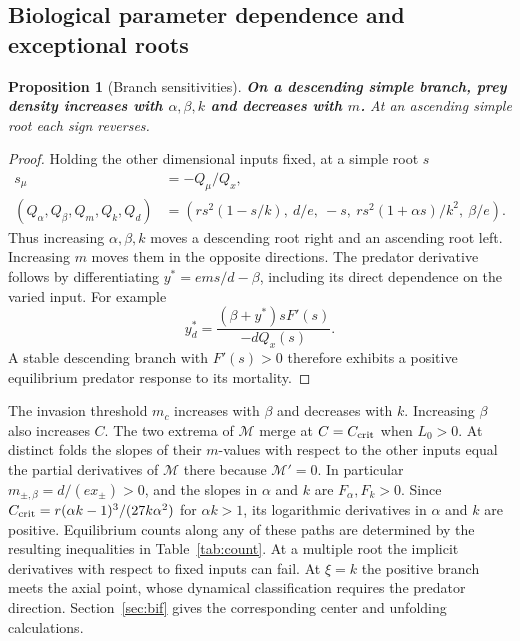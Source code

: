 \documentclass[12pt,a4paper,twoside,fleqn]{article}
\theoremstyle{journal}
\newtheorem{proposition}{Proposition}
\newcommand{\claim}[1]{{\normalfont\bfseries\boldmath #1}}
\begin{document}
\subsection{Biological parameter dependence and exceptional roots}
\begin{proposition}[Branch sensitivities]\label{prop:sens}
\claim{On a descending simple branch, prey density increases with \(\alpha,\beta,k\) and decreases with \(m\).} At an ascending simple root each sign reverses.
\end{proposition}
\begin{proof}
Holding the other dimensional inputs fixed, at a simple root \(s\)
\begin{equation}\label{eq:slopes}
 \begin{aligned}
 s_\mu&=-Q_\mu/Q_x,\\
 (Q_\alpha,Q_\beta,Q_m,Q_k,Q_d)
 &=\left(rs^2(1-s/k),\ d/e,\ -s,\ rs^2(1+\alpha s)/k^2,\ \beta/e\right).
 \end{aligned}
\end{equation}
Thus increasing \(\alpha,\beta,k\) moves a descending root right and an ascending root left. Increasing \(m\) moves them in the opposite directions. The predator derivative follows by differentiating \(y^*=ems/d-\beta\), including its direct dependence on the varied input. For example
\[
 y_d^*=\frac{(\beta+y^*)sF'(s)}{-dQ_x(s)} .
\]
A stable descending branch with \(F'(s)>0\) therefore exhibits a positive equilibrium predator response to its mortality. 

\end{proof}
The invasion threshold \(m_c\) increases with \(\beta\) and decreases with \(k\). Increasing \(\beta\) also increases \(C\). The two extrema of \(\mathcal M\) merge at \(C=C_{\rm crit}\) when \(L_0>0\). At distinct folds the slopes of their \(m\)-values with respect to the other inputs equal the partial derivatives of \(\mathcal M\) there because \(\mathcal M'=0\). In particular \(m_{\pm,\beta}=d/(ex_\pm)>0\), and the slopes in \(\alpha\) and \(k\) are \(F_\alpha,F_k>0\). Since \(C_{\rm crit}=r(\alpha k-1)^3/(27k\alpha^2)\) for \(\alpha k>1\), its logarithmic derivatives in \(\alpha\) and \(k\) are positive. Equilibrium counts along any of these paths are determined by the resulting inequalities in Table~\ref{tab:count}. At a multiple root the implicit derivatives with respect to fixed inputs can fail. At \(\xi=k\) the positive branch meets the axial point, whose dynamical classification requires the predator direction. Section~\ref{sec:bif} gives the corresponding center and unfolding calculations.
\end{document}

